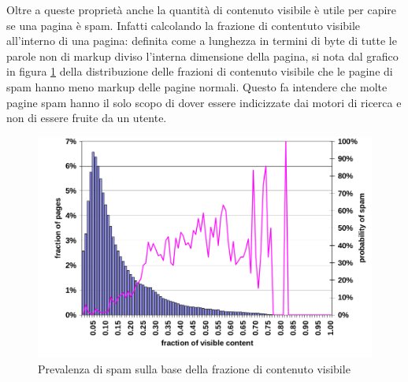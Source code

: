 Oltre a queste proprietà anche la quantità di contenuto visibile è utile per capire se una pagina è spam. Infatti calcolando la frazione di contentuto visibile all'interno di una pagina: definita come a lunghezza in termini di byte di tutte le parole non di markup diviso l'interna dimensione della pagina, si nota dal grafico in figura \ref{fig:fetterly7} della distribuzione delle frazioni di contenuto visibile che le pagine di spam hanno meno markup delle pagine normali. Questo fa intendere che molte pagine spam hanno il solo scopo di dover essere indicizzate dai motori di ricerca  e non di essere fruite da un utente.
\begin{figure}[htbp]
\centering
\includegraphics[width=12cm]{immagini/fetterly/fetterly7}
\caption{Prevalenza di spam sulla base della frazione di contenuto visibile}
\label{fig:fetterly7}
\end{figure}

